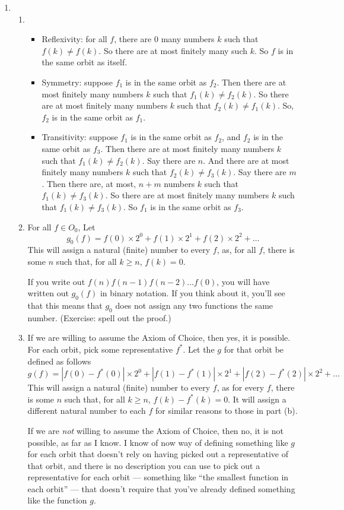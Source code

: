 \documentclass[12pt,a4paper]{article}
\begin{document}
\begin{enumerate}
\item \begin{enumerate}
	\item \begin{itemize}
		\item Reflexivity: for all $f$, there are 0 many numbers $k$ such that $f(k)\neq f(k)$. So there are at most finitely many such $k$. So $f$ is in the same orbit as itself.
		\item Symmetry: suppose $f_1$ is in the same orbit as $f_2$. Then there are at most finitely many numbers $k$ such that $f_1(k)\neq f_2(k)$. So there are at most finitely many numbers $k$ such that $f_2(k)\neq f_1(k)$. So, $f_2$ is in the same orbit as $f_1$.
		\item Transitivity: suppose $f_1$ is in the same orbit as $f_2$, and $f_2$ is in the same orbit as $f_3$. Then there are at most finitely many numbers $k$ such that $f_1(k)\neq f_2(k)$. Say there are $n$. And there are at most finitely many numbers $k$ such that $f_2(k)\neq f_3(k)$. Say there are $m$. Then there are, at most, $n+m$ numbers $k$ such that $f_1(k)\neq f_3(k)$. So there are at most finitely many numbers $k$ such that $f_1(k)\neq f_3(k)$. So $f_1$ is in the same orbit as $f_3$.
		\end{itemize}
	\item For all $f\in O_0$, Let $$g_0(f) = f(0)\times 2^0 + f(1)\times 2^1 +f(2)\times 2^2 +\ldots$$ This will assign a natural (finite) number to every $f$, as, for all $f$, there is some $n$ such that, for all $k\ge n$, $f(k)=0$.
	
	If you write out $f(n)f(n-1)f(n-2)\ldots f(0)$, you will have written out $g_0(f)$ in binary notation. If you think about it, you'll see that this means that $g_0$ does not assign any two functions the same number. (Exercise: spell out the proof.)
	\item If we are willing to assume the Axiom of Choice, then yes, it is possible. For each orbit, pick some representative $f^*$. Let the $g$ for that orbit be defined as follows $$g(f) = |f(0)-f^*(0)|\times 2^0 + |f(1)-f^*(1)| \times 2^1 + |f(2)-f^*(2)|\times 2^2 + \ldots$$ This will assign a natural (finite) number to every $f$, as for every $f$, there is some $n$ such that, for all $k\ge n$, $f(k)-f^*(k) = 0$. It will assign a different natural number to each $f$ for similar reasons to those in part (b).
	
	If we are \emph{not} willing to assume the Axiom of Choice, then no, it is not possible, as far as I know. I know of now way of defining something like $g$ for each orbit that doesn't rely on having picked out a representative of that orbit, and there is no description you can use to pick out a representative for each orbit --- something like ``the smallest function in each orbit'' --- that doesn't require that you've already defined something like the function $g$.
	

\end{enumerate}
\end{enumerate}
\end{document}
